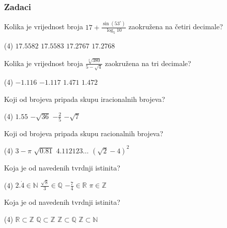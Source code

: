 \newpage

\subsubsection{Zadaci}

\setcounter{zadatak}{0}

\begin{zadatak}
    Kolika je vrijednost broja $\displaystyle 17 + \frac{\sin (53^{\circ})}{\log_5 10}$ zaokružena na četiri decimale?
    \begin{tasks}(4)
		\task $17.5582$
		\task $17.5583$
		\task $17.2767$
		\task $17.2768$
	\end{tasks}
\end{zadatak}

\begin{zadatak}
    Kolika je vrijednost broja $\displaystyle \frac{\sqrt[4]{380}}{5-\sqrt {4}}$ zaokružena na tri decimale?
    \begin{tasks}(4)
		\task $-1.116$
		\task $-1.117$
		\task $1.471$
		\task $1.472$
	\end{tasks}
\end{zadatak}

\begin{zadatak}
    Koji od brojeva pripada skupu iracionalnih brojeva?
    \begin{tasks}(4)
		\task $1.55$
		\task $-\sqrt{36}$
		\task $-\displaystyle\frac{2}{5}$
		\task $-\sqrt{7}$
	\end{tasks}
\end{zadatak}

\begin{zadatak}
	Koji od brojeva pripada skupu racionalnih brojeva?
    \begin{tasks}(4)
		\task $3-\pi$
		\task $\sqrt{0.81}$
		\task $4.112123\ldots$
		\task $(\sqrt{2}-4)^2$
	\end{tasks}
\end{zadatak}

\begin{zadatak}
	Koja je od navedenih tvrdnji istinita?
    \begin{tasks}(4)
		\task $2.\dot{4} \in \mathbb{N}$
		\task $\displaystyle \frac{\sqrt {8}}{3} \in \mathbb{Q}$
		\task $\displaystyle -\frac{7}{4} \in \mathbb{R}$
		\task $\pi \in \mathbb{Z}$
	\end{tasks}
\end{zadatak}

\begin{zadatak}
	Koja je od navedenih tvrdnji istinita?
    \begin{tasks}(4)
		\task $\mathbb{R} \subset \mathbb{Z}$
		\task $\mathbb{Q} \subset \mathbb{Z}$
		\task $\mathbb{Z} \subset \mathbb{Q}$
		\task $\mathbb{Z} \subset \mathbb{N}$
	\end{tasks}
\end{zadatak}


